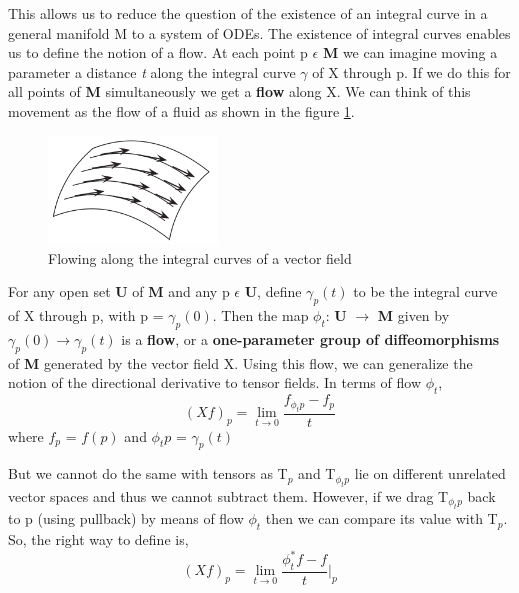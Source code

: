 This allows us to reduce the question of the existence of an integral curve in a general manifold M to a system of ODEs.
The existence of integral curves enables us to define the notion of a flow. 
At each point p $\epsilon$ \textbf{M} we can imagine moving a parameter a distance \textit{t} along the integral curve $\gamma$ of X through p. 
If we do this for all points of \textbf{M} simultaneously we get a \textbf{flow} along X. 
We can think of this movement as the flow of a fluid as shown in the figure \ref{fig:flow}.
\begin{figure}[ht]
    \begin{center}
        \includegraphics[width=0.4\textwidth]{figures/flow.png}
        \caption{Flowing along the integral curves of a vector field}
        \label{fig:flow}
    \end{center}
\end{figure}

For any open set \textbf{U} of \textbf{M} and any p $\epsilon$ \textbf{U}, define $\gamma_p(t)$ to be the integral curve of X through p, with p = $\gamma_p(0)$. 
Then the map $\phi_t$: \textbf{U} $\rightarrow$ \textbf{M} given by $\gamma_p(0) \rightarrow  \gamma_p(t)$ is a \textbf{flow}, 
or a \textbf{one-parameter group of diffeomorphisms} of \textbf{M} generated by the vector field X. 
Using this flow, we can generalize the notion of the directional derivative to tensor fields.
In terms of flow $\phi_t$,
\begin{equation}
    (Xf)_p =  \lim_{t\to 0} \frac{f_{\phi_t p} - f_p}{t} 
\end{equation}
where $f_p$ = $f(p)$ and $\phi_t p$ = $\gamma_p(t)$

But we cannot do the same with tensors as T$_p$ and T$_{\phi_t p}$ lie on different unrelated vector spaces and thus we cannot subtract them.
However, if we drag T$_{\phi_t p}$ back to p (using pullback) by means of flow $\phi_t$ then we can compare its value with T$_p$. 
So, the right way to define is,
\begin{equation}
    (Xf)_p =  \lim_{t\to 0} \frac{\phi_t^* f - f}{t} \Bigg|_{p}
\end{equation}

